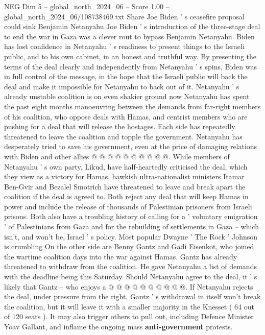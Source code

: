 \begin{textsample}{NEG Dim 5 – global\_north\_2024\_06 – Score 1.00 – global\_north\_2024\_06/108738469.txt}  \label{ex:f5_neg_140}
Share Joe Biden ' s ceasefire proposal could sink Benjamin Netanyahu Joe Biden ' s introduction of the three-stage deal to end the war in Gaza was a clever rout to bypass Benjamin Netanyahu.
Biden has lost confidence in Netanyahu ' s readiness to present things to the Israeli public, and to his own cabinet, in an honest and truthful way.
By presenting the terms of the deal clearly and independently from Netanyahu ' s spins, Biden was in full control of the message, in the hope that the Israeli public will back the deal and make it impossible for Netanyahu to back out of it.
Netanyahu ' s already unstable coalition is on even shakier ground now Netanyahu has spent the past eight months manoeuvring between the demands from far-right members of his coalition, who oppose deals with Hamas, and centrist members who are pushing for a deal that will release the hostages.
Each side has repeatedly threatened to leave the coalition and topple the government.
Netanyahu has desperately tried to save his government, even at the price of damaging relations with Biden and other allies @ @ @ @ @ @ @ @ @ @.
While members of Netanyahu ' s own party, Likud, have half-heartedly criticised the deal, which they view as a victory for Hamas, hawkish ultra-nationalist ministers Itamar Ben-Gvir and Bezalel Smotrich have threatened to leave and break apart the coalition if the deal is agreed to.
Both reject any deal that will keep Hamas in power and include the release of thousands of Palestinian prisoners from Israeli prisons.
Both also have a troubling history of calling for a ' voluntary emigration ' of Palestinians from Gaza and for the rebuilding of settlements in Gaza -- which isn't, and won't be, Israel ' s policy.
Most popular Dwayne ' The Rock ' Johnson is crumbling On the other side are Benny Gantz and Gadi Eisenkot, who joined the wartime coalition days into the war against Hamas.
Gantz has already threatened to withdraw from the coalition.
He gave Netanyahu a list of demands with the deadline being this Saturday.
Should Netanyahu agree to the deal, it ' s likely that Gantz -- who enjoys a @ @ @ @ @ @ @ @ @ @.
If Netanyahu rejects the deal, under pressure from the right, Gantz ' s withdrawal in itself won't break the coalition, but it will leave it with a smaller majority in the Knesset ( 64 out of 120 seats ).
It may also trigger others to pull out, including Defence Minister Yoav Gallant, and inflame the ongoing mass \textbf{anti-government} protests.

\end{textsample}
